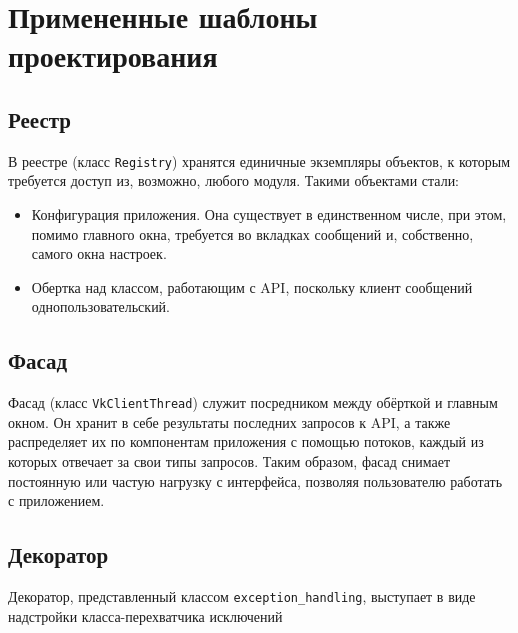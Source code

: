 \documentclass[12pt]{article}
\begin{document}
\newpage
\section{Примененные шаблоны проектирования}
\subsection{Реестр}
В реестре (класс {\tt Registry}) хранятся единичные экземпляры объектов, к которым требуется доступ из, возможно, любого модуля. Такими объектами стали:
\begin{itemize}
\setlength{\itemsep}{-1mm} %
\item Конфигурация приложения. Она существует в единственном числе, при этом, помимо главного окна, требуется во вкладках сообщений и, собственно, самого окна настроек.
\item Обертка над классом, работающим с API, поскольку клиент сообщений однопользовательский.
\end{itemize}

\subsection{Фасад}
Фасад (класс {\tt VkClientThread}) служит посредником между обёрткой и главным окном. Он хранит в себе результаты последних запросов к API, а также распределяет их по компонентам приложения с помощью потоков, каждый из которых отвечает за свои типы запросов. Таким образом, фасад снимает постоянную или частую нагрузку с интерфейса, позволяя пользователю работать с приложением.

\subsection{Декоратор}
Декоратор, представленный классом {\tt exception\_handling}, выступает в виде надстройки класса-перехватчика исключений
\end{document}
